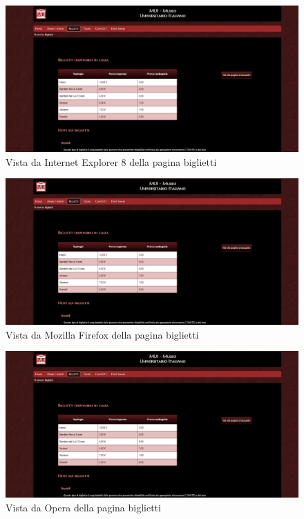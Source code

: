 \documentclass[10pt,a4paper,onecolumn]{article}
\begin{document}
\begin{figure}[H]
    \centering
    \includegraphics[scale=0.10]{biglietti_explorer8.png}
    \caption{Vista da Internet Explorer 8 della pagina biglietti}
\end{figure}

\begin{figure}[H]
    \centering
    \includegraphics[scale=0.10]{biglietti_firefox.png}
    \caption{Vista da Mozilla Firefox della pagina biglietti}
\end{figure}

\begin{figure}[H]
    \centering
    \includegraphics[scale=0.10]{biglietti_opera.png}
    \caption{Vista da Opera della pagina biglietti}
\end{figure}
\end{document}
